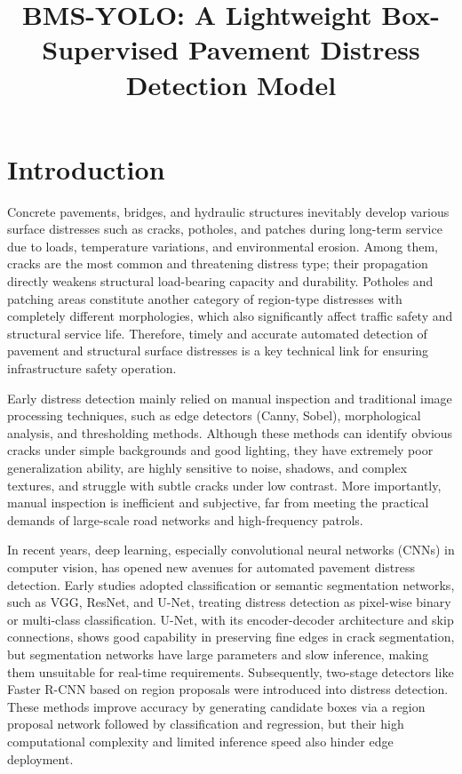 \documentclass[twocolumn]{sn-jnl}
\title{BMS-YOLO: A Lightweight Box-Supervised Pavement Distress Detection Model}
\author*[1]{\fnm{Qi} \sur{Liu}}
\affil[1]{\orgdiv{Department}, \orgname{University}, \orgaddress{\city{City}, \country{Country}}}
\begin{document}
	
	\maketitle
	
	\section{Introduction}
	Concrete pavements, bridges, and hydraulic structures inevitably develop various surface distresses such as cracks, potholes, and patches during long-term service due to loads, temperature variations, and environmental erosion. Among them, cracks are the most common and threatening distress type; their propagation directly weakens structural load-bearing capacity and durability. Potholes and patching areas constitute another category of region-type distresses with completely different morphologies, which also significantly affect traffic safety and structural service life. Therefore, timely and accurate automated detection of pavement and structural surface distresses is a key technical link for ensuring infrastructure safety operation.

	Early distress detection mainly relied on manual inspection and traditional image processing techniques, such as edge detectors (Canny, Sobel), morphological analysis, and thresholding methods. Although these methods can identify obvious cracks under simple backgrounds and good lighting, they have extremely poor generalization ability, are highly sensitive to noise, shadows, and complex textures, and struggle with subtle cracks under low contrast. More importantly, manual inspection is inefficient and subjective, far from meeting the practical demands of large-scale road networks and high-frequency patrols.

	In recent years, deep learning, especially convolutional neural networks (CNNs) in computer vision, has opened new avenues for automated pavement distress detection. Early studies adopted classification or semantic segmentation networks, such as VGG, ResNet, and U-Net, treating distress detection as pixel-wise binary or multi-class classification. U-Net, with its encoder-decoder architecture and skip connections, shows good capability in preserving fine edges in crack segmentation, but segmentation networks have large parameters and slow inference, making them unsuitable for real-time requirements. Subsequently, two-stage detectors like Faster R-CNN based on region proposals were introduced into distress detection. These methods improve accuracy by generating candidate boxes via a region proposal network followed by classification and regression, but their high computational complexity and limited inference speed also hinder edge deployment.
\end{document}
